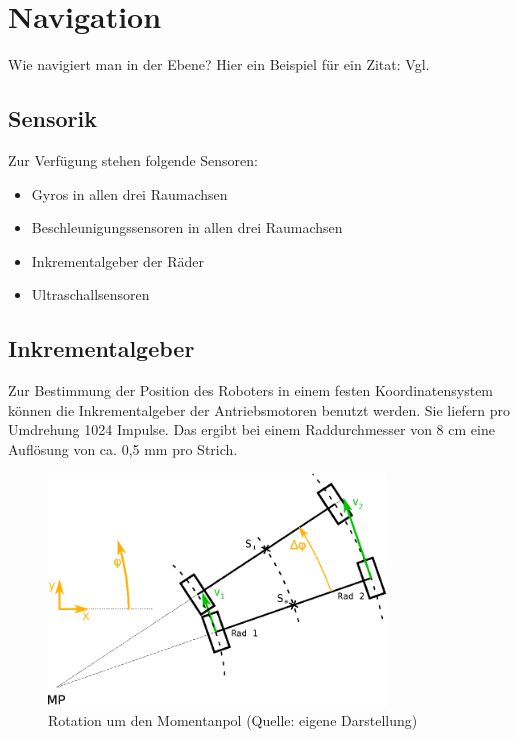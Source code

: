 \renewcommand{\autoren}{Stephan Morongowski}
\newpage
\section{Navigation}

Wie navigiert man in der Ebene? Hier ein Beispiel für ein Zitat: Vgl. \cite{bildungAtmosphaere}

\subsection{Sensorik}
Zur Verfügung stehen folgende Sensoren:
\begin{itemize}
\item Gyros in allen drei Raumachsen
\item Beschleunigungssensoren in allen drei Raumachsen
\item Inkrementalgeber der Räder
\item Ultraschallsensoren
\end{itemize}

\subsection{Inkrementalgeber}

Zur Bestimmung der Position des Roboters in einem festen Koordinatensystem können die Inkrementalgeber der Antriebsmotoren benutzt werden.
Sie liefern pro Umdrehung 1024 Impulse. Das ergibt bei einem Raddurchmesser von 8 cm eine Auflösung von ca. 0,5 mm pro Strich.

\begin{figure}[h]  %
\centering\includegraphics[width=0.8\textwidth]{images/Kurvenkinematic.eps}
\caption{Rotation um den Momentanpol \newline (Quelle: eigene Darstellung)}
\label{kurvenkinematik}
\end{figure}

